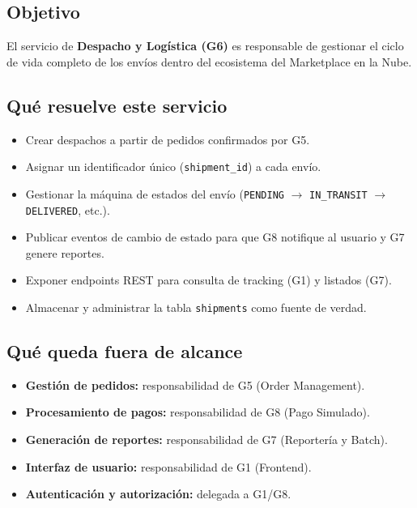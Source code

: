 \documentclass[11pt, a4paper]{article}
\begin{document}
\subsection{Objetivo}

El servicio de \textbf{Despacho y Logística (G6)} es responsable de gestionar el ciclo de vida completo de los envíos dentro del ecosistema del Marketplace en la Nube.

\subsection{Qué resuelve este servicio}

\begin{itemize}[noitemsep]
  \item Crear despachos a partir de pedidos confirmados por G5.
  \item Asignar un identificador único (\texttt{shipment\_id}) a cada envío.
  \item Gestionar la máquina de estados del envío (\texttt{PENDING} $\rightarrow$ \texttt{IN\_TRANSIT} $\rightarrow$ \texttt{DELIVERED}, etc.).
  \item Publicar eventos de cambio de estado para que G8 notifique al usuario y G7 genere reportes.
  \item Exponer endpoints REST para consulta de tracking (G1) y listados (G7).
  \item Almacenar y administrar la tabla \texttt{shipments} como fuente de verdad.
\end{itemize}

\subsection{Qué queda fuera de alcance}

\begin{itemize}[noitemsep]
  \item \textbf{Gestión de pedidos:} responsabilidad de G5 (Order Management).
  \item \textbf{Procesamiento de pagos:} responsabilidad de G8 (Pago Simulado).
  \item \textbf{Generación de reportes:} responsabilidad de G7 (Reportería y Batch).
  \item \textbf{Interfaz de usuario:} responsabilidad de G1 (Frontend).
  \item \textbf{Autenticación y autorización:} delegada a G1/G8.
\end{itemize}
\end{document}
